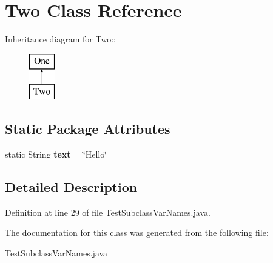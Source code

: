\section{Two Class Reference}
\label{classTwo}
Inheritance diagram for Two::\begin{figure}[H]
\begin{center}
\leavevmode
\includegraphics[height=2cm]{classTwo}
\end{center}
\end{figure}
\subsection*{Static Package Attributes}
\begin{CompactItemize}
\item 
static String {\bf text} = \char`\"{}Hello\char`\"{}\label{classTwo_355dae9e56984f3152bb1fe873c6a5e6}

\end{CompactItemize}


\subsection{Detailed Description}




Definition at line 29 of file Test\-Subclass\-Var\-Names.java.

The documentation for this class was generated from the following file:\begin{CompactItemize}
\item 
Test\-Subclass\-Var\-Names.java\end{CompactItemize}
